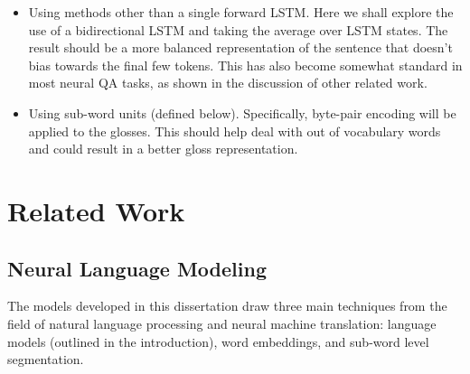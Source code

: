 \documentclass[11pt]{article}
\begin{document}
\begin{spacing}{1}
\begin{itemize}
\item Using methods other than a single forward LSTM. Here we shall explore the use of a bidirectional LSTM and taking the average over LSTM states. The result should be a more balanced representation of the sentence that doesn't bias towards the final few tokens. This has also become somewhat standard in most neural QA tasks, as shown in the discussion of other related work.

\item Using sub-word units (defined below). Specifically, byte-pair encoding \cite{sennrich2015neural} will be applied to the glosses. This should help deal with out of vocabulary words and could result in a better gloss representation. 
\end{itemize}

\section{Related Work}
\subsection{Neural Language Modeling}
The models developed in this dissertation draw three main techniques from the field of natural language processing and neural machine translation: language models (outlined in the introduction), word embeddings, and sub-word level segmentation. 


\end{spacing}
\end{document}
